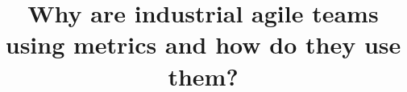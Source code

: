 \documentclass{sig-alternate}
\begin{document}
%


\title{Why are industrial agile teams using metrics and how do they use
them?}%

%
%
%
%
%
\end{document}
